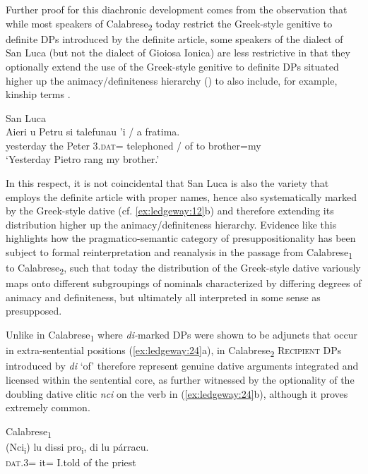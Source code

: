 \documentclass[output=paper,modfonts,nonflat,colorlinks,citecolor=brown]{langsci/langscibook}
\begin{document}
  Further proof for this diachronic development comes from the observation that while most speakers of Calabrese\textsubscript{2} today restrict the Greek-style genitive to definite DPs introduced by the definite article, some speakers of the dialect of San Luca (but not the dialect of Gioiosa Ionica) are less restrictive in that they optionally extend the use of the Greek-style genitive to definite DPs situated higher up the animacy/definiteness hierarchy (\citealt{Silverstein1976,Aissen2003}) to also include, for example, kinship terms .

\ea\label{ex:ledgeway:23}
  San Luca\\
\gll Aieri  u  Petru  si  talefunau  ’i  /  a  fratima.\\
  yesterday  the  Peter  3.\textsc{dat}=  telephoned  / of to brother=my\\
    \glt `Yesterday Pietro rang my brother.'
    \z 

In this respect, it is not coincidental that San Luca is also the variety that employs the definite article with proper names, hence also systematically marked by the Greek-style dative (cf. \ref{ex:ledgeway:12}b) and therefore extending its distribution higher up the animacy/definiteness hierarchy. Evidence like this highlights how the pragmatico-semantic category of presuppositionality has been subject to formal reinterpretation and reanalysis in the passage from Calabrese\textsubscript{1} to Calabrese\textsubscript{2}, such that today the distribution of the Greek-style dative variously maps onto different subgroupings of nominals characterized by differing degrees of animacy and definiteness, but ultimately all interpreted in some sense as presupposed.

Unlike in Calabrese\textsubscript{1} where \textit{di-}marked DPs were shown to be adjuncts that occur in extra-sentential positions (\ref{ex:ledgeway:24}a), in Calabrese\textsubscript{2} \textsc{Recipient} DPs introduced by \textit{di} ‘of’ therefore represent genuine dative arguments integrated and licensed within the sentential core, as further witnessed by the optionality of the doubling dative clitic \textit{nci} on the verb in (\ref{ex:ledgeway:24}b), although it proves extremely common.

\ea\label{ex:ledgeway:24}
\ea  Calabrese\textsubscript{1}\\
	\gll (Nci\textsubscript{i}) lu dissi pro\textsubscript{i}, di lu párracu.\\
       \textsc{dat}.3= it= I.told { } of the priest\\
\end{document}
